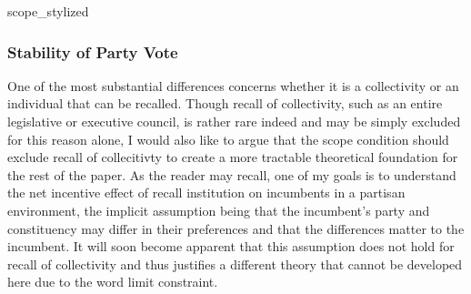 \documentclass[hyphens, crop=false]{standalone}
\begin{document}
		{scope_stylized}
		
		
		\subsubsection*{Stability of Party Vote}
		
		
		
		
		
		
		One of the most substantial differences concerns
		whether it is a collectivity or an individual that can be recalled.
		Though recall of collectivity, such as an entire legislative or executive council,
		is rather rare indeed
		\autocite{welpRecallReferendumWorld2020}
		and may be simply excluded for this reason alone,
		I would also like to argue that the scope condition should exclude
		recall of collecitivty to create a more tractable theoretical foundation
		for the rest of the paper.
		As the reader may recall,
		one of my goals
		is to understand the net incentive effect of recall institution
		on incumbents in a partisan environment,
		the implicit assumption being that
		the incumbent's party and constituency
		may differ in their preferences and that
		the differences matter to the incumbent.
		It will soon become apparent that this assumption does not hold
		for recall of collectivity and thus justifies a different theory
		that cannot be developed here due to the word limit constraint.
		
\end{document}
